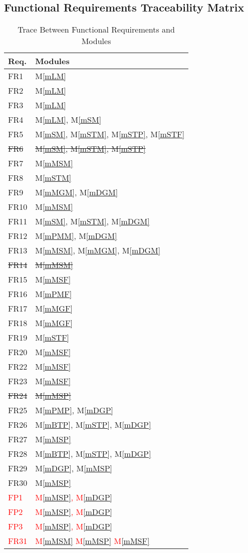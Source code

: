 \documentclass[12pt, titlepage]{article}
\newcommand{\mref}[1]{M\ref{#1}}
\begin{document}
\subsection{Functional Requirements Traceability Matrix}
\begin{table}[H]
\centering
\begin{tabular}{p{} p{}}
\toprule
\textbf{Req.} & \textbf{Modules}\\
\midrule
FR1 & \mref{mLM}\\
FR2 & \mref{mLM}\\
FR3 & \mref{mLM}\\
FR4 & \mref{mLM}, \mref{mSM}\\ 
FR5 & \mref{mSM}, \mref{mSTM}, \mref{mSTP}, \mref{mSTF}\\
\sout{FR6} & \sout{\mref{mSM}, \mref{mSTM}, \mref{mSTP}}\\
FR7 & \mref{mMSM}\\ 
FR8 & \mref{mSTM}\\
FR9 & \mref{mMGM}, \mref{mDGM}\\
FR10 & \mref{mMSM}\\
FR11 & \mref{mSM}, \mref{mSTM}, \mref{mDGM}\\
FR12 & \mref{mPMM}, \mref{mDGM}\\
FR13 & \mref{mMSM}, \mref{mMGM}, \mref{mDGM}\\
\sout{FR14} & \sout{\mref{mMSM}}\\ 
FR15 & \mref{mMSF}\\
FR16 & \mref{mPMF}\\
FR17 & \mref{mMGF} \\
FR18 & \mref{mMGF}\\
FR19 & \mref{mSTF}\\
FR20 & \mref{mMSF}\\
FR22 & \mref{mMSF}\\
FR23 & \mref{mMSF}\\
\sout{FR24} & \sout{\mref{mMSP}}\\ 
FR25 & \mref{mPMP}, \mref{mDGP}\\
FR26 & \mref{mBTP}, \mref{mSTP}, \mref{mDGP}\\
FR27 & \mref{mMSP}\\ 
FR28 & \mref{mBTP}, \mref{mSTP}, \mref{mDGP}\\
FR29 & \mref{mDGP}, \mref{mMSP}\\
FR30 & \mref{mMSP}\\
\textcolor{red}{FP1} & \textcolor{red}{\mref{mMSP}, \mref{mDGP}}\\
\textcolor{red}{FP2} & \textcolor{red}{\mref{mMSP}, \mref{mDGP}}\\
\textcolor{red}{FP3} & \textcolor{red}{\mref{mMSP}, \mref{mDGP}}\\
\textcolor{red}{FR31} & \textcolor{red}{\mref{mMSM} \mref{mMSP} \mref{mMSF}}\\
\bottomrule
\end{tabular}
\caption{Trace Between Functional Requirements and Modules}
\label{TblFRT}
\end{table}
\end{document}
